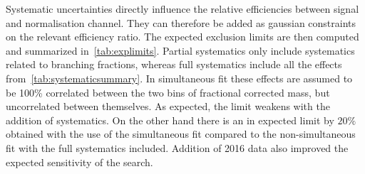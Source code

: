 Systematic uncertainties directly influence the relative efficiencies between signal and normalisation channel. They can therefore be added as gaussian constraints on the relevant efficiency ratio. The expected exclusion limits are then computed and summarized in~\autoref{tab:explimits}. Partial systematics only include systematics related to branching fractions, whereas full systematics include all the effects from~\autoref{tab:systematicsummary}. In \DIFaddbegin {}\DIFaddend simultaneous fit these effects are assumed to be 100\% correlated between the two bins of fractional corrected mass, but uncorrelated between themselves. As expected, the limit weakens with the addition of systematics. On the other hand there is an \DIFdelbegin {}\DIFdelend \DIFaddbegin {}\DIFaddend in expected limit by $20\%$ obtained with the use of the simultaneous fit compared to the non-simultaneous fit with the full systematics included. Addition of 2016 data also improved the expected sensitivity of the search. 

